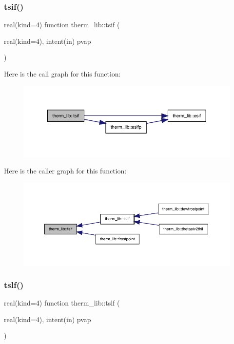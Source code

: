 \subsubsection{\texorpdfstring{tsif()}{tsif()}}
{\footnotesize\ttfamily real(kind=4) function therm\+\_\+lib\+::tsif (\begin{DoxyParamCaption}\item[{real(kind=4), intent(in)}]{pvap }\end{DoxyParamCaption})}

Here is the call graph for this function\+:
\nopagebreak
\begin{figure}[H]
\begin{center}
\leavevmode
\includegraphics[width=343pt]{namespacetherm__lib_a45fb7d736264472e118c794a243911fe_cgraph}
\end{center}
\end{figure}
Here is the caller graph for this function\+:
\nopagebreak
\begin{figure}[H]
\begin{center}
\leavevmode
\includegraphics[width=350pt]{namespacetherm__lib_a45fb7d736264472e118c794a243911fe_icgraph}
\end{center}
\end{figure}
\mbox{\label{namespacetherm__lib_af4ba481a98f65fb3f1e2ff6fb30ace23}} 
\subsubsection{\texorpdfstring{tslf()}{tslf()}}
{\footnotesize\ttfamily real(kind=4) function therm\+\_\+lib\+::tslf (\begin{DoxyParamCaption}\item[{real(kind=4), intent(in)}]{pvap }\end{DoxyParamCaption})}

